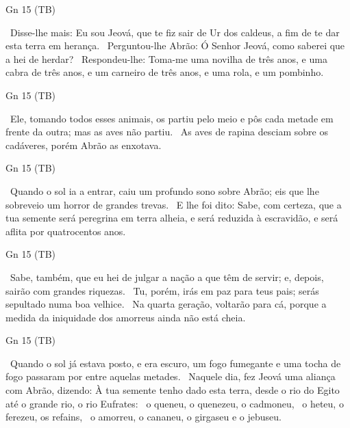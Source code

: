 \documentclass[12pt,aspectratio=169]{beamer}
\newcommand{\ver}[1]{%
    \raisebox{0.50ex}{%
        \scalebox{1.1}{%
            \pmb{\textbf{\textcolor{BSpbg}{#1}}}%
        }%
    }%
}
\newcommand{\QUOTE}[1]{%
    \par\noindent\hspace*{0.05\linewidth}%
    \begin{minipage}{0.9\linewidth}%
        \linespread{1.35}\large{#1}%
    \end{minipage}%
}
\newcommand{\RED}[1]{{\textcolor{TXred}{#1}}}
\newcommand{\ORA}[1]{{\textcolor{TXred!50!TXyel}{#1}}}
\newcommand{\YEL}[1]{{\textcolor{TXyel}{#1}}}
\begin{document}
    \begin{frame}{Gn 15 (TB)}
        \QUOTE{%
            \ver{7}~Disse-lhe mais: Eu sou Jeová, que te fiz sair de Ur dos caldeus, a fim de te
            dar \YEL{esta terra em herança}.
            \ver{8}~Perguntou-lhe Abrão: Ó Senhor Jeová, \YEL{como saberei} que a hei de herdar?
            \ver{9}~Respondeu-lhe: \YEL{Toma-me uma novilha} de três anos, e uma cabra de três
            anos, e um carneiro de três anos, e uma rola, e um pombinho.
        }
    \end{frame}

    \begin{frame}{Gn 15 (TB)}
        \QUOTE{%
            \ver{10}~Ele, tomando todos esses animais, os partiu pelo meio e pôs cada metade em
            frente da outra; mas as aves não partiu.
            \ver{11}~As aves de rapina desciam sobre os cadáveres, porém Abrão as enxotava.
        }
    \end{frame}

    \begin{frame}{Gn 15 (TB)}
        \QUOTE{%
            \ver{12}~Quando o sol ia a entrar, caiu um \ORA{profundo sono} sobre Abrão; eis que
            lhe sobreveio um \RED{horror de grandes trevas}.
            \ver{13}~E lhe foi dito: Sabe, \YEL{com certeza}, que a \RED{tua semente será
            peregrina} em \RED{terra alheia}, e será \RED{reduzida à escravidão}, e será
            \RED{aflita} por quatrocentos anos.
        }
    \end{frame}

    \begin{frame}{Gn 15 (TB)}
        \QUOTE{%
            \ver{14}~Sabe, também, que eu hei de \RED{julgar} a nação a que têm de servir; e,
            depois, \YEL{sairão} com grandes riquezas.
            \ver{15}~Tu, porém, \YEL{irás em paz} para teus pais; serás sepultado numa boa
            \YEL{velhice}.
            \ver{16}~Na quarta geração, voltarão para cá, \YEL{porque} a \RED{medida da
            iniquidade dos amorreus ainda não está cheia}.
        }
    \end{frame}

    \begin{frame}{Gn 15 (TB)}
        \QUOTE{%
            \ver{17}~Quando o sol já estava posto, e era escuro, um \YEL{fogo fumegante e uma
            tocha de fogo passaram por entre aquelas metades}.
            \ver{18}~Naquele dia, \YEL{fez Jeová uma aliança com Abrão}, dizendo: \YEL{À tua
            semente} tenho
            dado esta \YEL{terra}, desde o rio do Egito até o grande rio, o rio Eufrates:
            \ver{19}~o queneu, o quenezeu, o cadmoneu,
            \ver{20}~o heteu, o ferezeu, os refains,
            \ver{21}~o amorreu, o cananeu, o girgaseu e o jebuseu.
        }
    \end{frame}

\end{document}
